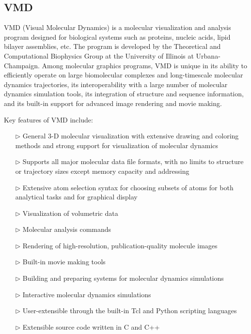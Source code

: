 \subsection{VMD}
VMD (Visual Molecular Dynamics) is a molecular visualization and analysis program designed for biological systems such as proteins, nucleic acids, lipid bilayer assemblies, etc. The program is developed by the Theoretical and Computational Biophysics Group at the University of Illinois at Urbana-Champaign. Among molecular graphics programs, VMD is unique in its ability to efficiently operate on large biomolecular complexes and long-timescale molecular dynamics trajectories, its interoperability with a large number of molecular dynamics simulation tools, its integration of structure and sequence information, and its built-in support for advanced image rendering and movie making.

Key features of VMD include:
\begin{itemize}
\item[$\triangleright$] General 3-D molecular visualization with extensive drawing and coloring methods and strong support for visualization of molecular dynamics
\item[$\triangleright$] Supports all major molecular data file formats, with no limits to structure or trajectory sizes except memory capacity and addressing
\item[$\triangleright$] Extensive atom selection syntax for choosing subsets of atoms for both analytical tasks and for graphical display
\item[$\triangleright$] Visualization of volumetric data
\item[$\triangleright$] Molecular analysis commands
\item[$\triangleright$] Rendering of high-resolution, publication-quality molecule images
\item[$\triangleright$] Built-in movie making tools
\item[$\triangleright$] Building and preparing systems for molecular dynamics simulations
\item[$\triangleright$] Interactive molecular dynamics simulations
\item[$\triangleright$] User-extensible through the built-in Tcl and Python scripting languages
\item[$\triangleright$] Extensible source code written in C and C++
\end{itemize}

